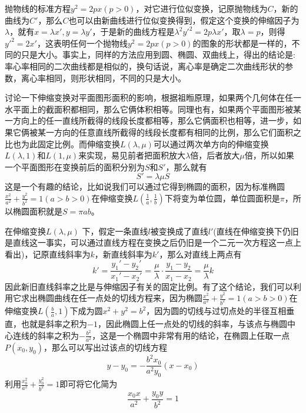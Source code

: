 \begin{example}[二次曲线的离心率决定其形状]
  抛物线的标准方程$y^2=2px(p>0)$，对它进行位似变换，记原抛物线为$C$，新的曲线为$C'$，那么$C$也可以由新曲线进行位似变换得到，假定这个变换的伸缩因子为$\lambda$，就有$x=\lambda x', y=\lambda y'$，于是新的曲线方程是$\lambda^2y'^2=2p\lambda x'$，取$\lambda = p$，则得$y'^2=2x'$，这表明任何一个抛物线$y^2=2px(p>0)$的图象的形状都是一样的，不同的只是大小。事实上，同样的方法应用到圆、椭圆、双曲线上，得出的结论是: 率心率相同的二次曲线都是相似的，换句话说，离心率是确定二次曲线形状的参数，离心率相同，则形状相同，不同的只是大小。
\end{example}

\begin{example}
  讨论一下伸缩变换对平面图形面积的影响，根据祖暅原理，如果两个几何体在任一水平面上的截面积都相同，那么它俩体积相等。同理也有，如果两个平面图形被某一方向上的任一直线所截得的线段长度都相等，那么它俩面积也相等，进一步，如果它俩被某一方向的任意直线所截得的线段长度都有相同的比例，那么它们面积之比也为此固定比例。而伸缩变换$L(\lambda, \mu)$可以通过两次单方向的伸缩变换$L(\lambda, 1)$和$L(1, \mu)$来实现，易见前者把面积放大$\lambda$倍，后者放大$\mu$倍，所以如果一个平面图形在变换前后的面积分别为$S$和$S'$，那么就有
  \begin{equation}
    \label{eq:area-for-scale-translation}
  S'=\lambda \mu S
  \end{equation}
这是一个有趣的结论，比如说我们可以通过它得到椭圆的面积，因为标准椭圆$\frac{x^2}{a^2}+\frac{y^2}{b^2}=1(a>b>0)$在伸缩变换$L(\frac{1}{a}, \frac{1}{b})$下将变为单位圆，单位圆面积是$\pi$，所以椭圆面积就是$S=\pi a b$。
\end{example}

\begin{example}
  \label{ep:the-tangent-after-scale-translation}
  在伸缩变换$L(\lambda, \mu)$ 下，假定一条直线$l$被变换成了直线$l'$(直线在伸缩变换下仍旧是直线这一事实，可以通过直线方程在变换之后仍旧是一个二元一次方程这一点上看出)，记原直线斜率为$k$，新直线斜率为$k'$，那么对直线上两点有
  \begin{equation}
    \label{eq:tangent-of-scale-translation}
  k'=\frac{y_1'-y_2'}{x_1'-x_2'}=\frac{\mu}{\lambda}\cdot \frac{y_1-y_2}{x_1-x_2}=\frac{\mu}{\lambda}k
  \end{equation}
  因此新旧直线斜率之比是与伸缩因子有关的固定比例。有了这个结论，我们可以利用它求出椭圆曲线在任一点处的切线方程来，因为椭圆$\frac{x^2}{a^2}+\frac{y^2}{b^2}=1(a>b>0)$在伸缩变换$L(\frac{b}{a},1)$下成为圆$x^2+y^2=b^2$，因为圆的切线与过切点处的半径互相垂直，也就是斜率之积为$-1$，因此椭圆上任一点处的切线的斜率，与该点与椭圆中心连线的斜率之积为$-\frac{b^2}{a^2}$，这是一个椭圆中非常有用的结论，在椭圆上任取一点$P(x_0,y_0)$，那么可以写出过该点的切线方程
  \begin{equation*}
  y-y_0=-\frac{b^2x_0}{a^2y_0}(x-x_0)
  \end{equation*}
  利用$\frac{x_0^2}{a^2}+\frac{y_0^2}{b^2}=1$即可将它化简为
  \begin{equation*}
  \frac{x_0x}{a^2}+\frac{y_0y}{b^2}=1
  \end{equation*}
\end{example}


